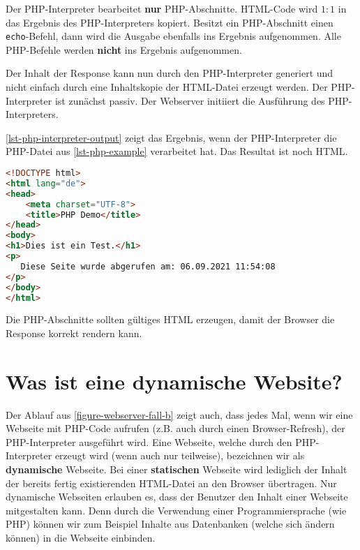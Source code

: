 \begin{important}
	Der \ac{PHP}-Interpreter bearbeitet \textbf{nur} \ac{PHP}-Abschnitte. \ac{HTML}-Code wird $1:1$ in das Ergebnis des \ac{PHP}-Interpreters kopiert. Besitzt ein \ac{PHP}-Abschnitt einen \texttt{echo}-Befehl, dann wird die Ausgabe ebenfalls ins Ergebnis aufgenommen. Alle \ac{PHP}-Befehle werden \textbf{nicht} ins Ergebnis aufgenommen.
\end{important}

Der Inhalt der Response kann nun durch den \ac{PHP}-Interpreter generiert und nicht einfach durch eine Inhaltskopie der \ac{HTML}-Datei erzeugt werden. Der \ac{PHP}-Interpreter ist zunächst passiv. Der Webserver initiiert die Ausführung des \ac{PHP}-Interpreters. 

\begin{example} \autoref{lst-php-interpreter-output} zeigt das Ergebnis, wenn der \ac{PHP}-Interpreter die \ac{PHP}-Datei aus \autoref{lst-php-example} verarbeitet hat. Das Resultat ist  noch \acs{HTML}.

\begin{lstlisting}[language=HTML, caption={Durch den \lstinline{echo}-Befehl wird für den \ac{PHP}-Abschnitt eine Ausgabe erzeugt.}, label={lst-php-interpreter-output}]
<!DOCTYPE html>
<html lang="de">
<head>
    <meta charset="UTF-8">
    <title>PHP Demo</title>
</head>
<body>
<h1>Dies ist ein Test.</h1>
<p>
   Diese Seite wurde abgerufen am: 06.09.2021 11:54:08
</p>
</body>
</html>
\end{lstlisting}

\end{example}

Die \ac{PHP}-Abschnitte sollten gültiges \ac{HTML} erzeugen, damit der Browser die Response korrekt rendern kann.

\section{Was ist eine dynamische Website?}

Der Ablauf aus \autoref{figure-webserver-fall-b} zeigt auch, dass jedes Mal, wenn wir eine Webseite mit \ac{PHP}-Code aufrufen (z.B. auch durch einen Browser-Refresh), der \ac{PHP}-Interpreter ausgeführt wird. Eine Webseite, welche durch den \ac{PHP}-Interpreter erzeugt wird (wenn auch nur teilweise), bezeichnen wir als \textbf{dynamische} Webseite. Bei einer \textbf{statischen} Webseite wird lediglich der Inhalt der bereits fertig existierenden \ac{HTML}-Datei an den Browser übertragen. Nur dynamische Webseiten erlauben es, dass der Benutzer den Inhalt einer Webseite mitgestalten kann. Denn durch die Verwendung einer Programmiersprache (wie \ac{PHP}) können wir zum Beispiel Inhalte aus Datenbanken (welche sich ändern können) in die Webseite einbinden.

